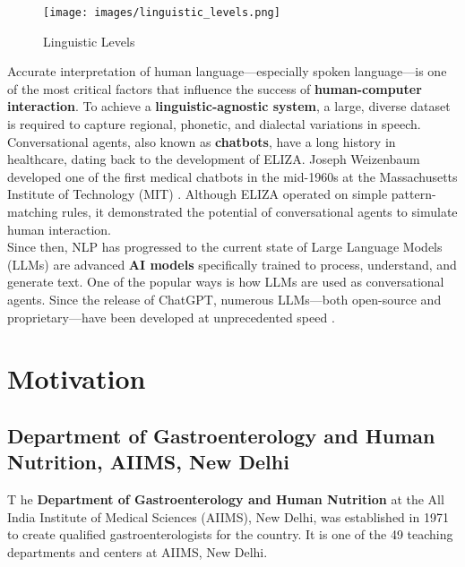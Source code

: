 \begin{figure}[h]
    \centering
    \texttt{[image: images/linguistic\_levels.png]}
    \caption{Linguistic Levels}
    \label{fig:linguistic_levels}
\end{figure}

\noindent Accurate interpretation of human language---especially spoken language---is one of the most critical factors that influence the success of \textcolor{TUMRed}{\textbf{human-computer interaction}}. To achieve a \textcolor{TUMRed}{\textbf{linguistic-agnostic system}}, a large, diverse dataset is required to capture regional, phonetic, and dialectal variations in speech.\\[\baselineskip]

\noindent Conversational agents, also known as \textcolor{TUMRed}{\textbf{chatbots}}, have a long history in healthcare, dating back to the development of ELIZA. Joseph Weizenbaum developed one of the first medical chatbots in the mid-1960s at the Massachusetts Institute of Technology (MIT) \cite{haug2023artificial, weizenbaum1966eliza}. Although ELIZA operated on simple pattern-matching rules, it demonstrated the potential of conversational agents to simulate human interaction.\\[\baselineskip]

\noindent Since then, NLP has progressed to the current state of Large Language Models (LLMs) are advanced \textcolor{TUMRed}{\textbf{AI models}} specifically trained to process, understand, and generate text. One of the popular ways is how LLMs are used as conversational agents. Since the release of ChatGPT, numerous LLMs---both open-source and proprietary---have been developed at unprecedented speed \cite{clusmann2023future}. 


\section{Motivation}
\subsection{Department of Gastroenterology and Human Nutrition, AIIMS, New Delhi}
\lettrine{T}{ }he \textcolor{TUMRed}{\textbf{Department of Gastroenterology and Human Nutrition}} at the All India Institute of Medical Sciences (AIIMS), New Delhi, was established in 1971 to create qualified gastroenterologists for the country. It is one of the 49 teaching departments and centers at AIIMS, New Delhi.\\[\baselineskip]

